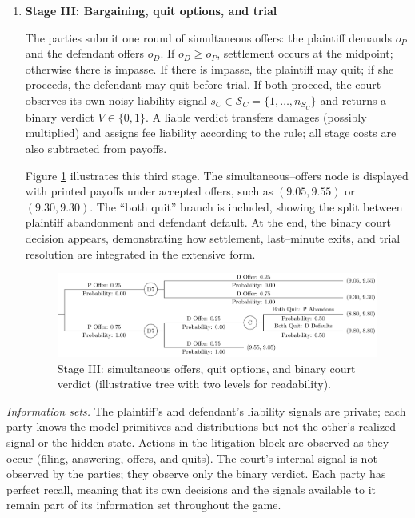 \documentclass{article}
\begin{document}
\begin{enumerate}
  \item \textbf{Stage III: Bargaining, quit options, and trial}

  The parties submit one round of simultaneous offers: the plaintiff demands $o_P$ and the defendant offers $o_D$. If $o_D \ge o_P$, settlement occurs at the midpoint; otherwise there is impasse. If there is impasse, the plaintiff may quit; if she proceeds, the defendant may quit before trial. If both proceed, the court observes its own noisy liability signal $s_C \in \mathcal{S}_C = \{1,\dots,n_{S_C}\}$ and returns a binary verdict $V \in \{0,1\}$. A liable verdict transfers damages (possibly multiplied) and assigns fee liability according to the rule; all stage costs are also subtracted from payoffs.

  Figure \ref{fig:smalltree_end.pdf} illustrates this third stage. The simultaneous--offers node is displayed with printed payoffs under accepted offers, such as $(9.05,9.55)$ or $(9.30,9.30)$. The “both quit” branch is included, showing the split between plaintiff abandonment and defendant default. At the end, the binary court decision appears, demonstrating how settlement, last--minute exits, and trial resolution are integrated in the extensive form.

  \begin{figure}[t]
    \centering
    \includegraphics[width=\textwidth]{../Figures/smalltree_end.pdf}
    \caption{Stage III: simultaneous offers, quit options, and binary court verdict (illustrative tree with two levels for readability).}
    \label{fig:smalltree_end.pdf}
  \end{figure}
\end{enumerate}


\emph{Information sets.} The plaintiff’s and defendant’s liability signals are private; each party knows the model primitives and distributions but not the other’s realized signal or the hidden state. Actions in the litigation block are observed as they occur (filing, answering, offers, and quits). The court’s internal signal is not observed by the parties; they observe only the binary verdict. Each party has perfect recall, meaning that its own decisions and the signals available to it remain part of its information set throughout the game. 

\printbibliography
\end{document}
